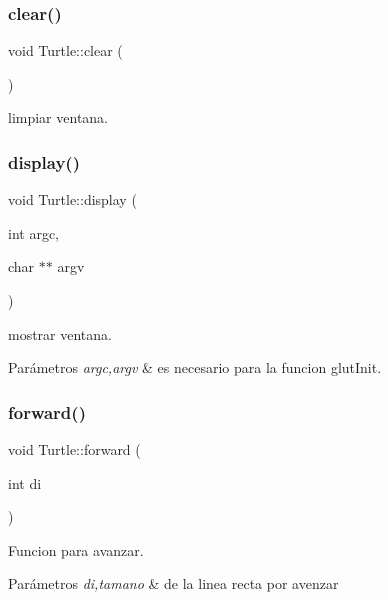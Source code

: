 \subsubsection{\texorpdfstring{clear()}{clear()}}
{\footnotesize\ttfamily void Turtle\+::clear (\begin{DoxyParamCaption}{ }\end{DoxyParamCaption})\hspace{0.3cm}{\ttfamily [inline]}}

limpiar ventana. \mbox{\label{classTurtle_ae62d0d6d90add2c86baa14ae01cdbe4a}} 
\subsubsection{\texorpdfstring{display()}{display()}}
{\footnotesize\ttfamily void Turtle\+::display (\begin{DoxyParamCaption}\item[{int}]{argc,  }\item[{char $\ast$$\ast$}]{argv }\end{DoxyParamCaption})}

mostrar ventana. 
\begin{DoxyParams}{Parámetros}
{\em argc,argv} & es necesario para la funcion glut\+Init. \\
\hline
\end{DoxyParams}
\mbox{\label{classTurtle_a8597b5fb6ad6abc2888a7246ffcf971c}} 
\subsubsection{\texorpdfstring{forward()}{forward()}}
{\footnotesize\ttfamily void Turtle\+::forward (\begin{DoxyParamCaption}\item[{int}]{di }\end{DoxyParamCaption})}

Funcion para avanzar. 
\begin{DoxyParams}{Parámetros}
{\em di,tamano} & de la linea recta por avenzar \\
\hline
\end{DoxyParams}
\mbox{\label{classTurtle_a8ba2af4d351e62de83ddfcc6bca51d9a}} 
